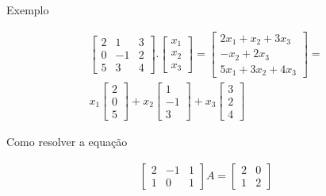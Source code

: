\documentclass{beamer}
\begin{document}
\begin{frame}{Exemplo }

  \begin{gather*}
    \begin{bmatrix}
      2 & 1 & 3 \\
      0 & -1 & 2 \\
      5 & 3 & 4 
    \end{bmatrix} . \begin{bmatrix}
      x_1 \\ x_2 \\ x_3
    \end{bmatrix} = \begin{bmatrix}
      2x_1 + x_2 + 3x_3 \\
      -x_2 + 2x_3 \\
      5x_1 + 3x_2 + 4x_3
    \end{bmatrix}= \\
     x_1\begin{bmatrix}
      2 \\ 0 \\ 5 
    \end{bmatrix}+x_2 \begin{bmatrix}
      1 \\ -1 \\ 3 
    \end{bmatrix} +x_3 \begin{bmatrix}
      3 \\ 2 \\ 4
    \end{bmatrix} 
  \end{gather*}

\end{frame}

\begin{frame}

Como resolver a equação

\begin{gather*}
\begin{bmatrix}
  2& -1 &1 \\
  1 & 0 & 1  
\end{bmatrix} A = \begin{bmatrix}
  2 & 0 \\ 1 & 2
\end{bmatrix}
  \end{gather*}

\end{frame}
\end{document}
